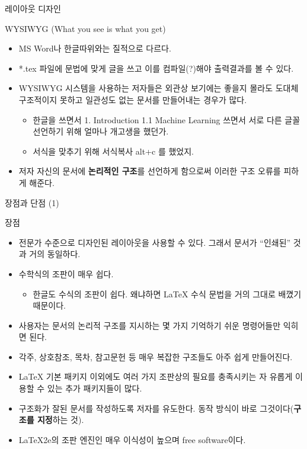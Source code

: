 \documentclass[10pt, mathserif, aspectratio=169]{beamer}
\begin{document}
\begin{frame}{레이아웃 디자인}
\begin{block}{WYSIWYG (What you see is what you get)}
\begin{itemize}
  \item MS Word나 한글따위와는 질적으로 다르다.
  \item *.tex 파일에 문법에 맞게 글을 쓰고 이를  컴파일(?)해야 출력결과를 볼 수 있다.
  \item WYSIWYG 시스템을 사용하는 저자들은 외관상 보기에는 좋을지 몰라도 도대체 구조적이지 못하고 일관성도 없는 문서를 만들어내는 경우가 많다.
  \begin{itemize}
    \item 한글을 쓰면서 1. Introduction 1.1 Machine Learning 쓰면서 서로 다른 글꼴 선언하기 위해 얼마나 개고생을 했던가.
    \item 서식을 맞추기 위해 서식복사 alt+c 를 했었지.
  \end{itemize}
  \item {} 저자 자신의 문서에 {\bf 논리적인 구조}를 선언하게 함으로써 이러한 구조 오류를 피하게 해준다.
\end{itemize}
\end{block}
\end{frame}


\begin{frame}{장점과 단점 (1)}
\begin{block}{장점}
\begin{itemize}
  \item 전문가 수준으로 디자인된 레이아웃을 사용할 수 있다. 그래서 문서가 “인쇄된” 것과 거의 동일하다.
  \item 수학식의 조판이 매우 쉽다.
  \begin{itemize}
    \item 한글도 수식의 조판이 쉽다. 왜냐하면 \LaTeX{} 수식 문법을 거의 그대로 배꼈기 때문이다.
  \end{itemize}
  \item 사용자는 문서의 논리적 구조를 지시하는 몇 가지 기억하기 쉬운 명령어들만 익히면 된다.
  \item 각주, 상호참조, 목차, 참고문헌 등 매우 복잡한 구조들도 아주 쉽게 만들어진다.
  \item \LaTeX{} 기본 패키지 이외에도 여러 가지 조판상의 필요를 충족시키는 자 유롭게 이용할 수 있는 추가 패키지들이 많다.
  \item {} 구조화가 잘된 문서를 작성하도록 저자를 유도한다.  동작 방식이 바로 그것이다({\bf 구조를 지정}하는 것).
  \item \LaTeX2e의 조판 엔진인  매우 이식성이 높으며 free software이다.
\end{itemize}
\end{block}
\end{frame}
\end{document}
